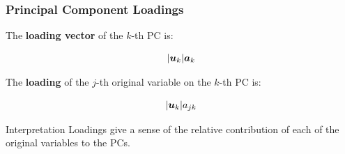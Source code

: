 \documentclass{beamer}
\begin{document}
\begin{frame}
  \frametitle{Principal Component Loadings}

The \textbf{loading vector} of the $k$-th PC is:

\[
|\bm{u}_k|\bm{a}_k
\]

The \textbf{loading} of the $j$-th original variable on the $k$-th PC is:

\[
|\bm{u}_k|a_{jk}
\]

\begin{block}{Interpretation}
Loadings give a sense of the relative contribution of each of the original variables to the PCs.
\end{block}

\end{frame}
\end{document}
